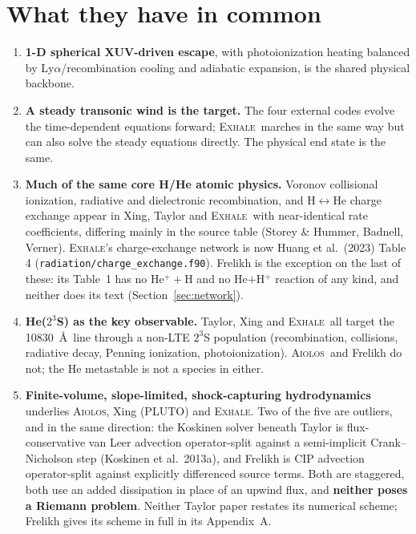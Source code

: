 \documentclass[english,a4paper]{my_memo}
\newcommand{\EXHALE}{\textsc{Exhale}}
\newcommand{\AIOLOS}{\textsc{Aiolos}}
\newcommand{\Lya}{Ly$\alpha$}
\begin{document}
\section{What they have in common}
\label{sec:common}

\begin{enumerate}[nosep]
  \item \textbf{1-D spherical XUV-driven escape}, with photoionization heating
    balanced by \Lya/recombination cooling and adiabatic expansion, is the
    shared physical backbone.
  \item \textbf{A steady transonic wind is the target.} The four external
    codes evolve the time-dependent equations forward; \EXHALE\ marches in the
    same way but can also solve the steady equations directly. The physical end
    state is the same.
  \item \textbf{Much of the same core H/He atomic physics.} Voronov collisional
    ionization, radiative and dielectronic recombination, and
    H$\leftrightarrow$He charge exchange appear in Xing, Taylor and \EXHALE\
    with near-identical rate coefficients, differing mainly in the source table
    (Storey \& Hummer, Badnell, Verner). \EXHALE's charge-exchange network is
    now Huang et al.\ (2023) Table 4 (\texttt{radiation/charge\_exchange.f90}).
    Frelikh is the exception on the last of these: its Table~1 has no
    He$^+ + $H and no He$ + $H$^+$ reaction of any kind, and neither does its
    text (Section~\ref{sec:network}).
  \item \textbf{He($2^3$S) as the key observable.} Taylor, Xing and \EXHALE\
    all target the 10830~\AA\ line through a non-LTE $2^3$S population
    (recombination, collisions, radiative decay, Penning ionization,
    photoionization). \AIOLOS\ and Frelikh do not; the He metastable is not a
    species in either.
  \item \textbf{Finite-volume, slope-limited, shock-capturing hydrodynamics}
    underlies \AIOLOS, Xing (PLUTO) and \EXHALE. Two of the five are outliers,
    and in the same direction: the Koskinen solver beneath Taylor is
    flux-conservative van Leer advection operator-split against a semi-implicit
    Crank--Nicholson step (Koskinen et al.\ 2013a), and Frelikh is CIP
    advection operator-split against explicitly differenced source terms. Both
    are staggered, both use an added dissipation in place of an upwind flux,
    and \textbf{neither poses a Riemann problem}. Neither Taylor paper restates
    its numerical scheme; Frelikh gives its scheme in full in its Appendix~A.
\end{enumerate}
\end{document}
